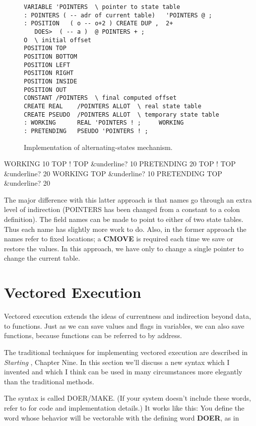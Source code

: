 \begin{figure*}
\caption{Implementation of alternating-states mechanism.}
\begin{center}
\begin{BVerbatim}
VARIABLE 'POINTERS  \ pointer to state table
: POINTERS ( -- adr of current table)   'POINTERS @ ;
: POSITION   ( o -- o+2 ) CREATE DUP ,  2+
   DOES>  ( -- a )  @ POINTERS + ;
O  \ initial offset
POSITION TOP
POSITION BOTTOM
POSITION LEFT
POSITION RIGHT
POSITION INSIDE
POSITION OUT
CONSTANT /POINTERS  \ final computed offset
CREATE REAL    /POINTERS ALLOT  \ real state table
CREATE PSEUDO  /POINTERS ALLOT  \ temporary state table
: WORKING      REAL 'POINTERS ! ;     WORKING
: PRETENDING   PSEUDO 'POINTERS ! ;
\end{BVerbatim}
\end{center}
\end{figure*}

\begin{Code}[commandchars=&\{\}]
WORKING
10 TOP !
TOP &underline{? 10}
PRETENDING
20 TOP !
TOP &underline{? 20}
WORKING
TOP &underline{? 10}
PRETENDING
TOP &underline{? 20}
\end{Code}
The major difference with this latter approach is that names go through
an extra level of indirection (POINTERS has been changed from a
constant to a colon definition). The field names can be made to point to
either of two state tables. Thus each name has slightly more work to do.
Also, in the former approach the names refer to fixed locations; a
\textbf{CMOVE} is required each time we save or restore the values. In this
approach, we have only to change a single pointer to change the current
table.

\section{Vectored Execution}

Vectored execution extends the ideas of currentness and indirection
beyond data, to functions. Just as we can save values and flags in
variables, we can also save functions, because functions can be referred to
by address.

The traditional techniques for implementing vectored execution are
described in \emph{Starting \Forth{}}, Chapter Nine. In this section we'll
discuss a new syntax which I invented and which I think can be used in many
circumstances more elegantly than the traditional methods.

The syntax is called DOER/MAKE. (If your system doesn't include
these words, refer to  for code and implementation details.) It
works like this: You define the word whose behavior will be vectorable
with the defining word \textbf{DOER}, as in


